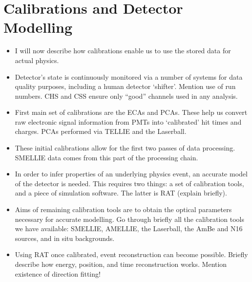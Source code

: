 {    \section{Calibrations and Detector Modelling}
    \begin{itemize}
        \item I will now describe how calibrations enable us to use the stored data for actual physics.
        \item Detector's state is continuously monitored via a number of systems for data quality purposes, including a human detector `shifter'. Mention use of run numbers. CHS and CSS ensure only ``good'' channels used in any analysis.
        \item First main set of calibrations are the ECAs and PCAs. These help us convert raw electronic signal information from PMTs into `calibrated' hit times and charges. PCAs performed via TELLIE and the Laserball.
        \item These initial calibrations allow for the first two passes of data processing. SMELLIE data comes from this part of the processing chain.
        \item In order to infer properties of an underlying physics event, an accurate model of the detector is needed. This requires two things: a set of calibration tools, and a piece of simulation software. The latter is RAT (explain briefly).
        \item Aims of remaining calibration tools are to obtain the optical parameters necessary for accurate modelling. Go through briefly all the calibration tools we have available: SMELLIE, AMELLIE, the Laserball, the AmBe and N16 sources, and in situ backgrounds.
        \item Using RAT once calibrated, event reconstruction can become possible. Briefly describe how energy, position, and time reconstruction works. Mention existence of direction fitting!
    \end{itemize}
}
